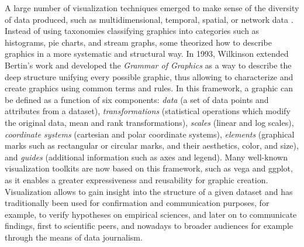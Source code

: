 A large number of visualization techniques emerged to make sense of the diversity of data produced, such as multidimensional, temporal, spatial, or network data \cite{shneidermanEyesHaveIt1996}.
Instead of using taxonomies classifying graphics into categories such as histograms, pie charts, and stream graphs, some theorized how to describe graphics in a more systematic and structural way.
In 1993, Wilkinson extended Bertin's work and developed the \textit{Grammar of Graphics} \cite{wilkinsonGrammarGraphics2005} as a way to describe the deep structure unifying every possible graphic, thus allowing to characterize and create graphics using common terms and rules.
In this framework, a graphic can be defined as a function of six components: \textsl{data} (a set of data points and attributes from a dataset), \textsl{transformations} (statistical operations which modify the original data, \eg mean and rank transformations),  \textsl{scales} (\eg linear and log scales),  \textsl{coordinate systems} (\eg cartesian and polar coordinate systems), \textsl{elements} (graphical marks such as rectangular or circular marks, and their aesthetics, \eg color, and size), and \textsl{guides} (additional information such as axes and legend).
Many well-known visualization toolkits are now based on this framework, such as vega\cite{satyanarayan2016vega} and ggplot\cite{wickham2006introduction}, as it enables a greater expressiveness and reusability for graphic creation.
Visualization allows to gain insight into the structure of a given dataset and has traditionally been used for confirmation and communication purposes\cite{shneidermanInventingDiscoveryTools2002}, for example, to verify hypotheses on empirical sciences, and later on to communicate findings, first to scientific peers, and nowadays to broader audiences for example through the means of data journalism\cite{bradshawDataJournalism2017}.




